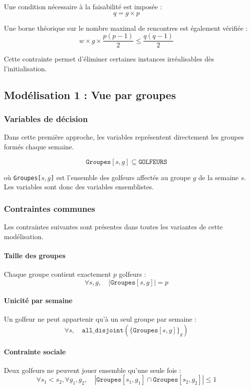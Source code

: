 \documentclass{article}
\begin{document}
Une condition nécessaire à la faisabilité est imposée :
\[
q = g \times p
\]

Une borne théorique sur le nombre maximal de rencontres est également vérifiée :
\[
w \times g \times \frac{p(p-1)}{2} \leq \frac{q(q-1)}{2}
\]

Cette contrainte permet d’éliminer certaines instances irréalisables dès l’initialisation.

\subsection{Modélisation 1 : Vue par groupes}

\subsubsection{Variables de décision}

Dans cette première approche, les variables représentent directement les groupes formés chaque semaine.

\[
\texttt{Groupes}[s,g] \subseteq \texttt{GOLFEURS}
\]

où \texttt{Groupes[$s,g$]} est l’ensemble des golfeurs affectés au groupe $g$ de la semaine $s$.
Les variables sont donc des variables ensemblistes.

\subsubsection{Contraintes communes}

Les contraintes suivantes sont présentes dans toutes les variantes de cette modélisation.

\paragraph{Taille des groupes}
Chaque groupe contient exactement $p$ golfeurs :
\[
\forall s,g,\quad |\texttt{Groupes}[s,g]| = p
\]

\paragraph{Unicité par semaine}
Un golfeur ne peut appartenir qu’à un seul groupe par semaine :
\[
\forall s,\quad \texttt{all\_disjoint}(\{\texttt{Groupes}[s,g]\}_{g})
\]

\paragraph{Contrainte sociale}
Deux golfeurs ne peuvent jouer ensemble qu’une seule fois :
\[
\forall s_1 < s_2,\forall g_1,g_2,\quad
|\texttt{Groupes}[s_1,g_1] \cap \texttt{Groupes}[s_2,g_2]| \leq 1
\]
\end{document}
